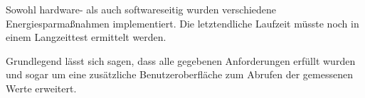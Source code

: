 Sowohl hardware- als auch softwareseitig wurden verschiedene Energiesparmaßnahmen implementiert. Die letztendliche Laufzeit müsste noch in einem Langzeittest ermittelt werden.

Grundlegend lässt sich sagen, dass alle gegebenen Anforderungen erfüllt wurden und sogar um eine zusätzliche Benutzeroberfläche zum Abrufen der gemessenen Werte erweitert.



